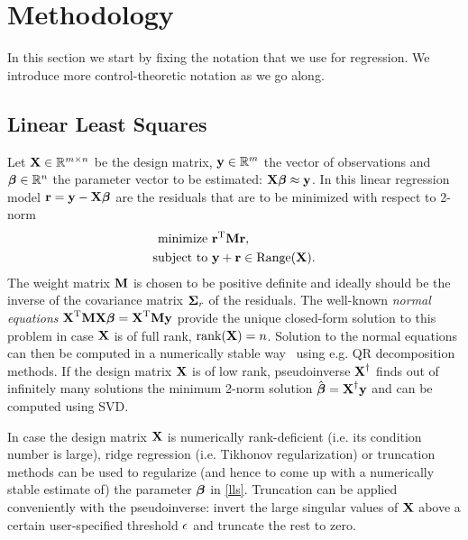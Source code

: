 \section{Methodology}\label{methodology}
%
In this section we start by fixing the notation that we use for regression. We introduce more control-theoretic notation as we go along.
%
\subsection{Linear Least Squares}
Let $\boldsymbol{\mathrm{X}} \in \mathbb{R}^{m \times n}$ be the design matrix, $\boldsymbol{\mathrm{y}} \in \mathbb{R}^{m}$ the vector of observations and  $\boldsymbol{\mathrm{\beta}} \in \mathbb{R}^{n}$ the parameter vector to be estimated: $\boldsymbol{\mathrm{X}}\boldsymbol{\mathrm{\beta}} \approx \boldsymbol{\mathrm{y}}$. In this linear regression model $\boldsymbol{\mathrm{r}} = \boldsymbol{\mathrm{y}} - \boldsymbol{\mathrm{X}}\boldsymbol{\mathrm{\beta}}$ are the residuals that are to be minimized with respect to 2-norm~\cite{Golub80}
%
\begin{equation}
\begin{aligned}
\text{minimize} &\ \boldsymbol{\mathrm{r}}^{\mathrm{T}}\boldsymbol{\mathrm{M}}\boldsymbol{\mathrm{r}}, \\
\text{subject to} &\ \boldsymbol{\mathrm{y}} + \boldsymbol{\mathrm{r}} \in \text{Range}(\boldsymbol{\mathrm{X}}).
\end{aligned}
\label{lls}
\end{equation}
%
\noindent The weight matrix $\boldsymbol{\mathrm{M}}$ is chosen to be positive definite and ideally should be the inverse of the covariance matrix $\boldsymbol{\mathrm{\Sigma}}_{r}$ of the residuals. The well-known \emph{normal equations} $\boldsymbol{\mathrm{X}}^{\mathrm{T}}\boldsymbol{\mathrm{M}}\boldsymbol{\mathrm{X}} \boldsymbol{\mathrm{\beta}} = \boldsymbol{\mathrm{X}}^{\mathrm{T}} \boldsymbol{\mathrm{M}}\boldsymbol{\mathrm{y}}$ provide the unique closed-form solution to this problem in case $\boldsymbol{\mathrm{X}}$ is of full rank, $\text{rank}(\boldsymbol{\mathrm{X}}) = n$. Solution to the normal equations can then be computed in a numerically stable way~\cite{Golub96} using e.g. QR decomposition methods. If the design matrix $\boldsymbol{\mathrm{X}}$ is of low rank, pseudoinverse $\boldsymbol{\mathrm{X}}^{\dagger}$ finds out of infinitely many solutions the minimum 2-norm solution $\hat{\boldsymbol{\mathrm{\beta}}} = \boldsymbol{\mathrm{X}}^{\dagger}\boldsymbol{\mathrm{y}}$ and can be computed using SVD. %

In case the design matrix $\boldsymbol{\mathrm{X}}$ is numerically rank-deficient (i.e. its condition number is large), ridge regression (i.e. Tikhonov regularization) or truncation methods can be used to regularize (and hence to come up with a numerically stable estimate of) the parameter $\boldsymbol{\mathrm{\beta}}$ in \eqref{lls}. Truncation can be applied conveniently with the pseudoinverse: invert the large singular values of $\boldsymbol{\mathrm{X}}$ above a certain user-specified threshold $\epsilon$ and truncate the rest to zero.

